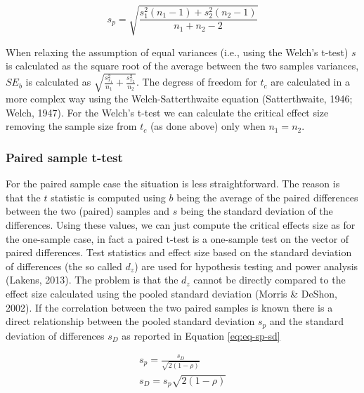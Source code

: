 \documentclass[
  man]{apa7}
\begin{document}
\begin{equation}
    \label{eq:eq-s-p-twsmp}
    s_p = \sqrt{\frac{s_1^2 (n_1 - 1) + s_2^2 (n_2 - 1)}{n_1 + n_2 - 2}}
\end{equation}

When relaxing the assumption of equal variances (i.e., using the Welch's t-test) \(s\) is calculated as the square root of the average between the two samples variances, \(SE_b\) is calculated as \(\sqrt{\frac{s^2_{x_1}}{n_1} + \frac{s^2_{x_2}}{n_2}}\). The degress of freedom for \(t_c\) are calculated in a more complex way using the Welch-Satterthwaite equation (Satterthwaite, 1946; Welch, 1947). For the Welch's t-test we can calculate the critical effect size removing the sample size from \(t_c\) (as done above) only when \(n_1 = n_2\).

\hypertarget{paired-sample-t-test}{%
\subsubsection{Paired sample t-test}\label{paired-sample-t-test}}

For the paired sample case the situation is less straightforward. The reason is that the \(t\) statistic is computed using \(b\) being the average of the paired differences between the two (paired) samples and \(s\) being the standard deviation of the differences. Using these values, we can just compute the critical effects size as for the one-sample case, in fact a paired t-test is a one-sample test on the vector of paired differences. Test statistics and effect size based on the standard deviation of differences (the so called \(d_z\)) are used for hypothesis testing and power analysis (Lakens, 2013). The problem is that the \(d_z\) cannot be directly compared to the effect size calculated using the pooled standard deviation (Morris \& DeShon, 2002). If the correlation between the two paired samples is known there is a direct relationship between the pooled standard deviation \(s_p\) and the standard deviation of differences \(s_D\) as reported in Equation \eqref{eq:eq-sp-sd}

\begin{equation}
    \label{eq:eq-sp-sd}
    \begin{gathered}
        s_p =  \frac{s_D}{\sqrt{2(1 - \rho)}} \\
        s_D =  s_p \sqrt{2(1 - \rho)}
    \end{gathered}
\end{equation}
\end{document}
